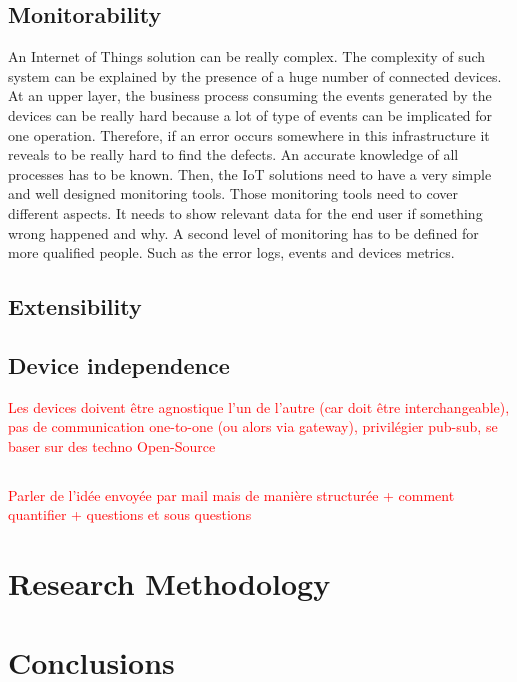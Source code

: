 \documentclass[11pt]{article}
\begin{document}
\subsection{Monitorability}

An Internet of Things solution can be really complex. The complexity of such system can be explained by the presence of a huge number of connected devices. At an upper layer, the business process consuming the events generated by the devices can be really hard because a lot of type of events can be implicated for one operation. Therefore, if an error occurs somewhere in this infrastructure it reveals to be really hard to find the defects. An accurate knowledge of all processes has to be known. Then, the IoT solutions need to have a very simple and well designed monitoring tools. Those monitoring tools need to cover different aspects. It needs to show relevant data for the end user if something wrong happened and why. A second level of monitoring has to be defined for more qualified people. Such as the error logs, events and devices metrics.

\subsection{Extensibility}

\subsection{Device independence}

\textcolor{red}{Les devices doivent être agnostique l'un de l'autre (car doit être interchangeable), pas de communication one-to-one (ou alors via gateway), privilégier pub-sub, se baser sur des techno Open-Source}


\subsection{ }
\textcolor{red}{Parler de l'idée envoyée par mail mais de manière structurée + comment quantifier + questions et sous questions}


\section{Research Methodology}


\section{Conclusions}


\newpage
\listoffigures
\nocite{*}
\printbibliography
\end{document}
